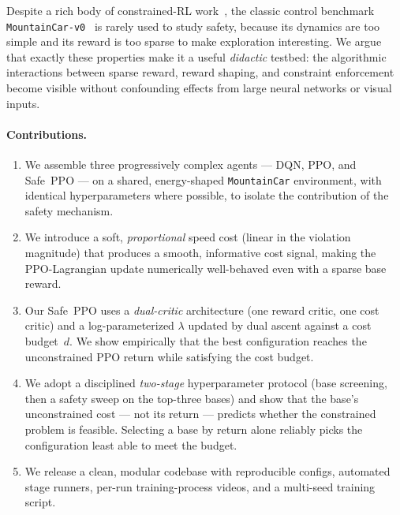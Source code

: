 \documentclass{article}
\begin{document}
Despite a rich body of constrained-RL work~\citep{achiam2017cpo,ray2019benchmarking,stooke2020responsive,tessler2018reward,chow2018risk},
the classic control benchmark \texttt{MountainCar-v0}~\citep{moore1990mountaincar,brockman2016openaigym}
is rarely used to study safety, because its dynamics are too simple and its reward is too sparse
to make exploration interesting. We argue that exactly these properties make it a useful
\emph{didactic} testbed: the algorithmic interactions between sparse reward, reward shaping, and
constraint enforcement become visible without confounding effects from large neural networks or
visual inputs.

\paragraph{Contributions.}
\begin{enumerate}
    \item We assemble three progressively complex agents --- DQN, PPO, and Safe~PPO ---
          on a shared, energy-shaped \texttt{MountainCar} environment, with identical hyperparameters
          where possible, to isolate the contribution of the safety mechanism.
    \item We introduce a soft, \emph{proportional} speed cost (linear in the violation magnitude)
          that produces a smooth, informative cost signal, making the
          PPO-Lagrangian update numerically well-behaved even with a sparse base reward.
    \item Our Safe~PPO uses a \emph{dual-critic} architecture (one reward critic, one cost
          critic) and a log-parameterized $\lambda$ updated by dual ascent against a cost budget~$d$.
          We show empirically that the best configuration reaches the unconstrained PPO return while
          satisfying the cost budget.
    \item We adopt a disciplined \emph{two-stage} hyperparameter protocol (base screening, then
          a safety sweep on the top-three bases) and show that the base's unconstrained cost --- not
          its return --- predicts whether the constrained problem is feasible. Selecting a base by
          return alone reliably picks the configuration least able to meet the budget.
    \item We release a clean, modular codebase with reproducible configs, automated stage runners,
          per-run training-process videos, and a multi-seed training script.
\end{enumerate}
\end{document}
